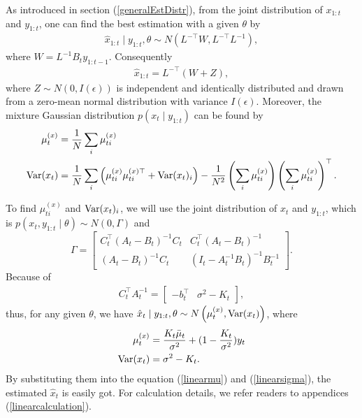 As introduced in section (\ref{generalEstDistr}), from the joint distribution of $x_{1:t}$ and $y_{1:t}$, one can find the best estimation with a given $\theta$ by
\begin{align*}
\hat{x}_{1:t} \mid y_{1:t},\theta \sim N(L^{-\top}W,L^{-\top}L^{-1}),
\end{align*}
where $W = L^{-1}B_{t}y_{1:t-1}$. 
Consequently 
\begin{align*}
\hat{x}_{1:t} = L^{-\top}(W+Z),
\end{align*}
where $Z \sim N(0, I(\epsilon))$ is independent and identically distributed and drawn from a zero-mean normal distribution with variance $ I(\epsilon)$. Moreover, the mixture Gaussian distribution  $p(x_t \mid y_{1:t})$ can be found by 
\begin{align}
\mu_t^{(x)} &= \frac{1}{N} \sum_i \mu_{ti}^{(x)} \label{linearmu}  \\
\mathrm{Var}(x_t) &= \frac{1}{N} \sum_i \left( \mu_{ti}^{(x)}  \mu_{ti}^{(x)\top} +\mathrm{Var}(x_t)_i\right) -\frac{1}{N^2} \left(  \sum_i  \mu_{ti}^{(x)} \right) \left( \sum_i \mu_{ti}^{(x)} \right) ^\top.\label{linearsigma} 
\end{align}


To find $\mu_{ti}^{(x)}$ and $\mathrm{Var}(x_t)_i$, we will use the joint distribution of $x_{t}$ and $y_{1:t}$, which is $p(x_{t}, y_{1:t}  \mid  \theta)\sim N(0,\Gamma)$ and 
\begin{equation*}
\Gamma=\begin{bmatrix} C_{t}^\top(A_t-B_t)^{-1}C_{t} & C_{t}^\top(A_t-B_t)^{-1}\\(A_t-B_t)^{-1}C_{t} & (I_t-A_t^{-1}B_t)^{-1}B_t^{-1} \end{bmatrix}.
\end{equation*}
Because of 
\begin{align*}
C_{t}^\top A_{t}^{-1} = \left[\begin{matrix} - b_{t}^\top & \sigma^2- K_{t} \end{matrix} \right],
\end{align*}
thus, for any given $\theta$, we have $\hat{x}_{t}\mid y_{1:t},\theta \sim N\left( \mu_{t}^{(x)},\mathrm{Var}(x_t) \right)$, where
\begin{align}
\mu_{t}^{(x)} &  =  \frac{K_{t}\bar{\mu}_{t}}{\sigma^2}+(1-\frac{K_{t}}{\sigma^2})y_{t} \\
\mathrm{Var}(x_t)&= \sigma^2-K_{t}.
\end{align}
By substituting them into the equation (\ref{linearmu}) and (\ref{linearsigma}), the estimated $\hat{x}_t$ is easily got. For calculation details, we refer readers to appendices (\ref{linearcalculation}). 


